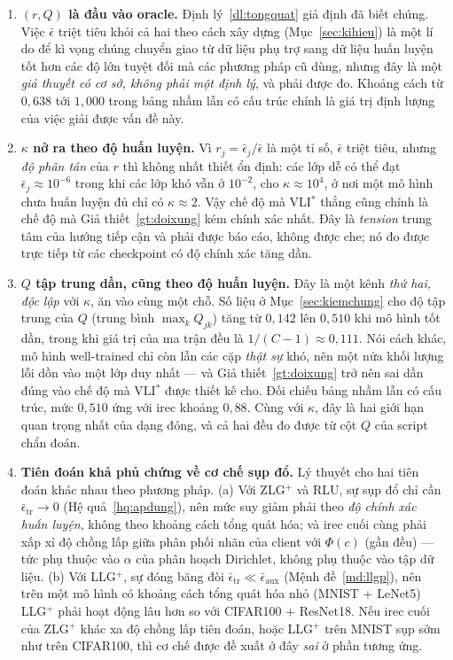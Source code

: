 \documentclass[11pt]{article}
\theoremstyle{remark}
\begin{document}
\begin{enumerate}
\item \textbf{$(r,Q)$ là đầu vào oracle.} Định lý~\ref{dl:tongquat} giả định
  đã biết chúng. Việc $\bar\epsilon$ triệt tiêu khỏi cả hai theo cách xây
  dựng (Mục~\ref{sec:kihieu}) là một lí do để kì vọng chúng chuyển giao từ
  dữ liệu phụ trợ sang dữ liệu huấn luyện tốt hơn các độ lớn tuyệt đối mà
  các phương pháp cũ dùng, nhưng đây là một \emph{giả thuyết có cơ sở, không
  phải một định lý}, và phải được đo. Khoảng cách từ $0{,}638$ tới $1{,}000$
  trong bảng nhầm lẫn có cấu trúc chính là giá trị định lượng của việc giải
  được vấn đề này.

\item \textbf{$\kappa$ nở ra theo độ huấn luyện.} Vì
  $r_j = \bar\epsilon_j/\bar\epsilon$ là một tỉ số, $\bar\epsilon$ triệt
  tiêu, nhưng \emph{độ phân tán} của $r$ thì không nhất thiết ổn định: các
  lớp dễ có thể đạt $\bar\epsilon_j\approx10^{-6}$ trong khi các lớp khó vẫn
  ở $10^{-2}$, cho $\kappa \approx 10^4$, ở nơi một mô hình chưa huấn luyện
  đủ chỉ có $\kappa \approx 2$. Vậy chế độ mà VLI$^*$ thắng cũng chính là chế
  độ mà Giả thiết~\ref{gt:doixung} kém chính xác nhất. Đây là \emph{tension}
  trung tâm của hướng tiếp cận và phải được báo cáo, không được che; nó đo
  được trực tiếp từ các checkpoint có độ chính xác tăng dần.

\item \textbf{$Q$ tập trung dần, cũng theo độ huấn luyện.} Đây là một kênh
  \emph{thứ hai, độc lập} với $\kappa$, ăn vào cùng một chỗ. Số liệu ở
  Mục~\ref{sec:kiemchung} cho độ tập trung của $Q$ (trung bình
  $\max_k Q_{jk}$) tăng từ $0{,}142$ lên $0{,}510$ khi mô hình tốt dần, trong
  khi giá trị của ma trận đều là $1/(C-1)\approx0{,}111$. Nói cách khác, mô
  hình well-trained chỉ còn lẫn các cặp \emph{thật sự} khó, nên một nửa khối
  lượng lỗi dồn vào một lớp duy nhất --- và
  Giả thiết~\ref{gt:doixung} trở nên sai dần đúng vào chế độ mà VLI$^*$ được
  thiết kế cho. Đối chiếu bảng nhầm lẫn có cấu trúc, mức $0{,}510$ ứng với
  irec khoảng $0{,}88$. Cùng với $\kappa$, đây là hai giới hạn quan trọng
  nhất của dạng đóng, và cả hai đều đo được từ cột $Q$ của script chẩn đoán.

\item \textbf{Tiên đoán khả phủ chứng về cơ chế sụp đổ.} Lý thuyết cho hai
  tiên đoán khác nhau theo phương pháp. (a) Với ZLG$^+$ và RLU, sự sụp đổ chỉ
  cần $\bar\epsilon_{\mathrm{tr}}\to0$ (Hệ quả~\ref{hq:apdung}), nên mức suy
  giảm phải theo \emph{độ chính xác huấn luyện}, không theo khoảng cách tổng
  quát hóa; và irec cuối cùng phải xấp xỉ độ chồng lấp giữa phân phối nhãn của
  client với $\Phi(c)$ (gần đều) --- tức phụ thuộc vào $\alpha$ của phân hoạch
  Dirichlet, không phụ thuộc vào tập dữ liệu. (b) Với LLG$^+$, sự đóng băng đòi
  $\bar\epsilon_{\mathrm{tr}} \ll \bar\epsilon_{\mathrm{aux}}$
  (Mệnh đề~\ref{md:llgp}), nên trên một mô hình có khoảng cách tổng quát hóa
  nhỏ (MNIST + LeNet5) LLG$^+$ phải hoạt động lâu hơn so với CIFAR100 +
  ResNet18. Nếu irec cuối của ZLG$^+$ khác xa độ chồng lấp tiên đoán, hoặc
  LLG$^+$ trên MNIST sụp sớm như trên CIFAR100, thì cơ chế được đề xuất ở đây
  \emph{sai} ở phần tương ứng.


\end{enumerate}
\end{document}
